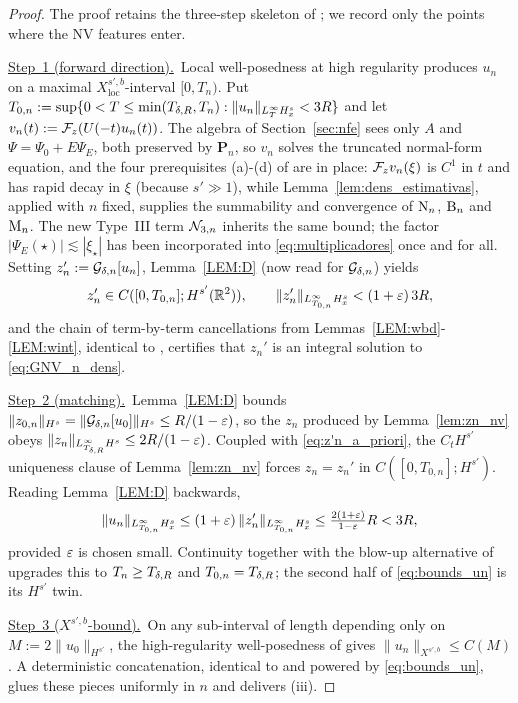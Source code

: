 \begin{proof}
The proof retains the three-step skeleton of
\cite[Lemma~5.5]{chcora}; we record only the points where the NV
features enter.

\smallskip
\noindent\underline{Step~1 (forward direction).}\
Local well-posedness at high regularity
\cite{angelopolous,kazeykinamunoz1,kazeykinamunoz2} produces $u_n$
on a maximal $X^{s',b}_{\mathrm{loc}}$-interval $[0,T_n)$. Put
$T_{0,n}:=\sup\{0<T\le\min(T_{\delta,R},T_n):
\|u_n\|_{L^\infty_T H^s_x}<3R\}$ and let
$v_n(t):=\mathcal{F}_z(U(-t)u_n(t))$. The algebra of
Section~\ref{sec:nfe} sees only $A$ and $\Psi=\Psi_0+E\Psi_E$, both
preserved by $\mathbf{P}_n$, so $v_n$ solves the truncated normal-form
equation, and the four prerequisites (a)-(d) of
\cite[Section~4]{KOY20} are in place: $\mathcal{F}_z v_n(\xi)$ is $C^1$ in $t$ and
has rapid decay in $\xi$ (because $s'\gg 1$), while
Lemma~\ref{lem:dens_estimativas}, applied with $n$ fixed, supplies
the summability and convergence of $\mathrm{N}_n$, $\mathrm{B}_n$ and $\mathrm{M}_n$.
The new Type~III term $\mathcal{N}_{3,n}$ inherits the same bound; the
factor $|\Psi_E(\star)|\lesssim|\xi_\star|$ has been incorporated
into \eqref{eq:multiplicadores} once and for all. Setting
$z_n':=\mathcal{G}_{\delta,n}[u_n]$, Lemma~\ref{LEM:D} (now read for
$\mathcal{G}_{\delta,n}$) yields
\begin{equation}\label{eq:z'n_a_priori}
z_n'\in C([0,T_{0,n}];H^{s'}(\mathbb{R}^2)),
\qquad
\|z_n'\|_{L^\infty_{T_{0,n}}H^s_x}<(1+\varepsilon)\,3R,
\end{equation}
and the chain of term-by-term cancellations from
Lemmas~\ref{LEM:wbd}-\ref{LEM:wint}, identical to
\cite{chcora}, certifies that $z_n'$ is an integral solution to
\eqref{eq:GNV_n_dens}.

\smallskip
\noindent\underline{Step~2 (matching).}\
Lemma~\ref{LEM:D} bounds
$\|z_{0,n}\|_{H^s}=\|\mathcal{G}_{\delta,n}[u_0]\|_{H^s}\le R/(1-\varepsilon)$, so the
$z_n$ produced by Lemma~\ref{lem:zn_nv} obeys
$\|z_n\|_{L^\infty_{T_{\delta,R}}H^s}\le 2R/(1-\varepsilon)$. Coupled with
\eqref{eq:z'n_a_priori}, the $C_t H^{s'}$ uniqueness clause of
Lemma~\ref{lem:zn_nv} forces $z_n=z_n'$ in $C([0,T_{0,n}];H^{s'})$.
Reading Lemma~\ref{LEM:D} backwards,
\begin{equation}\label{eq:un_bound_step2}
\|u_n\|_{L^\infty_{T_{0,n}}H^s_x}
\le (1+\varepsilon)\,\|z_n'\|_{L^\infty_{T_{0,n}}H^s_x}
\le \tfrac{2(1+\varepsilon)}{1-\varepsilon}R<3R,
\end{equation}
provided $\varepsilon$ is chosen small. Continuity together with the
blow-up alternative of
\cite{angelopolous,kazeykinamunoz1,kazeykinamunoz2} upgrades this to
$T_n\ge T_{\delta,R}$ and $T_{0,n}=T_{\delta,R}$; the second half of
\eqref{eq:bounds_un} is its $H^{s'}$ twin.

\smallskip
\noindent\underline{Step~3 ($X^{s',b}$-bound).}\
On any sub-interval of length depending only on
$M:=2\|u_0\|_{H^{s'}}$, the high-regularity well-posedness of
\cite{angelopolous,kazeykinamunoz1,kazeykinamunoz2} gives
$\|u_n\|_{X^{s',b}}\le C(M)$. A deterministic concatenation,
identical to \cite[Lemma~5.5, Step~3]{chcora} and powered by
\eqref{eq:bounds_un}, glues these pieces uniformly in $n$ and
delivers (iii).
\end{proof}


